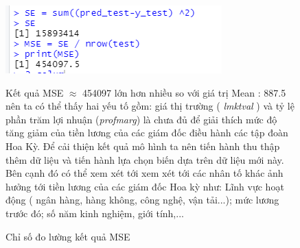\begin{figure}[H]
	\centering
	\includegraphics[width=.5\linewidth]{../Photo Of Result/B1_MSE.PNG}  
	\caption{Chỉ số đo lường kết quả MSE}
	\label{fig-b1:mse}

Kết quả MSE $\approx$ 454097 lớn hơn nhiều so với giá trị Mean : 887.5 nên ta có thể thấy hai yếu tố gồm: giá thị trường ( \textit{lmktval} ) và tỷ lệ phần trăm lợi nhuận (\textit{profmarg}) là chưa đủ để giải thích mức độ tăng giảm của tiền lương của các giám đốc điều hành các tập đoàn Hoa Kỳ. Để cải thiện kết quả mô hình ta nên tiến hành thu thập thêm dữ liệu và tiến hành lựa chọn biến dựa trên dữ liệu mới này. Bên cạnh đó có thể xem xét tới xem xét tới các nhân tố khác ảnh hưởng tới tiền lương của các giám đốc Hoa kỳ như: Lĩnh vực hoạt động ( ngân hàng, hàng không, công nghệ, vận tải...); mức lương trước đó; số năm kinh nghiệm, giới tính,...
	

\end{figure}
